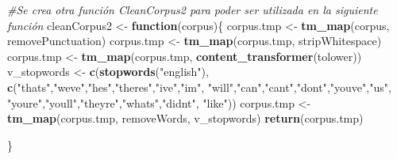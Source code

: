 \documentclass[
]{article}
\newenvironment{Shaded}{\begin{snugshade}}{\end{snugshade}}
\newcommand{\CommentTok}[1]{\textcolor[rgb]{0.56,0.35,0.01}{\textit{#1}}}
\newcommand{\ControlFlowTok}[1]{\textcolor[rgb]{0.13,0.29,0.53}{\textbf{#1}}}
\newcommand{\KeywordTok}[1]{\textcolor[rgb]{0.13,0.29,0.53}{\textbf{#1}}}
\newcommand{\NormalTok}[1]{#1}
\newcommand{\StringTok}[1]{\textcolor[rgb]{0.31,0.60,0.02}{#1}}
\begin{document}
\begin{Shaded}
\begin{Highlighting}[]
\CommentTok{#Se crea otra función CleanCorpus2 para poder ser utilizada en la siguiente función}
\NormalTok{cleanCorpus2 <-}\StringTok{ }\ControlFlowTok{function}\NormalTok{(corpus)\{}
\NormalTok{  corpus.tmp <-}\StringTok{ }\KeywordTok{tm_map}\NormalTok{(corpus, removePunctuation)}
\NormalTok{  corpus.tmp <-}\StringTok{ }\KeywordTok{tm_map}\NormalTok{(corpus.tmp, stripWhitespace)}
\NormalTok{  corpus.tmp <-}\StringTok{ }\KeywordTok{tm_map}\NormalTok{(corpus.tmp, }\KeywordTok{content_transformer}\NormalTok{(tolower))}
\NormalTok{  v_stopwords <-}\StringTok{ }\KeywordTok{c}\NormalTok{(}\KeywordTok{stopwords}\NormalTok{(}\StringTok{"english"}\NormalTok{), }\KeywordTok{c}\NormalTok{(}\StringTok{"thats"}\NormalTok{,}\StringTok{"weve"}\NormalTok{,}\StringTok{"hes"}\NormalTok{,}\StringTok{"theres"}\NormalTok{,}\StringTok{"ive"}\NormalTok{,}\StringTok{"im"}\NormalTok{,}
                                           \StringTok{"will"}\NormalTok{,}\StringTok{"can"}\NormalTok{,}\StringTok{"cant"}\NormalTok{,}\StringTok{"dont"}\NormalTok{,}\StringTok{"youve"}\NormalTok{,}\StringTok{"us"}\NormalTok{,}
                                           \StringTok{"youre"}\NormalTok{,}\StringTok{"youll"}\NormalTok{,}\StringTok{"theyre"}\NormalTok{,}\StringTok{"whats"}\NormalTok{,}\StringTok{"didnt"}\NormalTok{, }\StringTok{"like"}\NormalTok{))}
\NormalTok{  corpus.tmp <-}\StringTok{ }\KeywordTok{tm_map}\NormalTok{(corpus.tmp, removeWords, v_stopwords)}
  \KeywordTok{return}\NormalTok{(corpus.tmp)}
  
\NormalTok{\}}


\end{Highlighting}
\end{Shaded}
\end{document}
